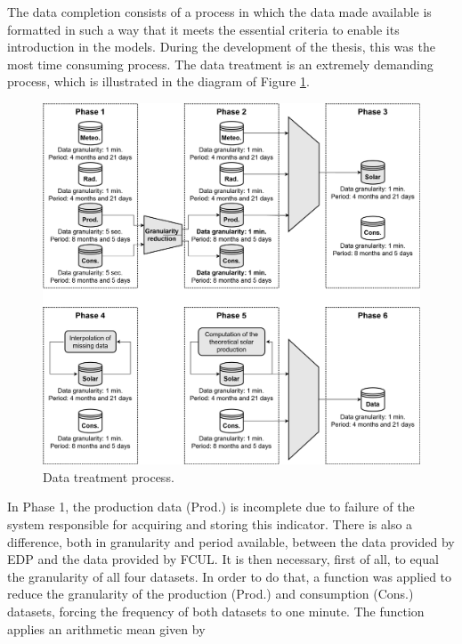 The data completion consists of a process in which the data made available is formatted in such a way that it meets the essential criteria to enable its introduction in the models. During the development of the thesis, this was the most time consuming process. The data treatment is an extremely demanding process, which is illustrated in the diagram of Figure \ref{datatreatment}.

\begin{figure}[h!]
    \centering
    \begin{center}
    \includegraphics[width=1\textwidth]{Images/Data.png}
    \caption{Data treatment process.}
    \label{datatreatment}
    \end{center}
\end{figure}

In Phase 1, the production data (Prod.) is incomplete due to failure of the system responsible for acquiring and storing this indicator. There is also a difference, both in granularity and period available, between the data provided by \ac{EDP} and the data provided by \ac{FCUL}. It is then necessary, first of all, to equal the granularity of all four datasets. In order to do that, a function was applied to reduce the granularity of the production (Prod.) and consumption (Cons.) datasets, forcing the frequency of both datasets to one minute. The function applies an arithmetic mean given by 

